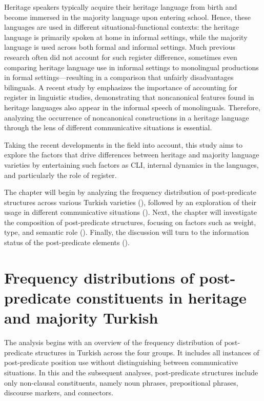 Heritage speakers typically acquire their heritage language from birth and become immersed in the majority language upon entering school. Hence, these languages are used in different situational-functional contexts: the heritage language is primarily spoken at home in informal settings, while the majority language is used across both formal and informal settings. Much previous research often did not account for such register difference, sometimes even comparing heritage language use in informal settings to monolingual productions in formal settings—resulting in a comparison that unfairly disadvantages bilinguals. A recent study by \citet{WieseEtAl2022} emphasizes the importance of accounting for register in linguistic studies, demonstrating that noncanonical features found in heritage languages also appear in the informal speech of monolinguals. Therefore, analyzing the occurrence of noncanonical constructions in a heritage language through the lens of different communicative situations is essential.

Taking the recent developments in the field into account, this study aims to explore the factors that drive differences between heritage and majority language varieties by entertaining such factors as CLI, internal dynamics in the languages, and particularly the role of register.

The chapter will begin by analyzing the frequency distribution of post-predicate structures across various Turkish varieties (), followed by an exploration of their usage in different communicative situations (). Next, the chapter will investigate the composition of post-predicate structures, focusing on factors such as weight, type, and semantic role (). Finally, the discussion will turn to the information status of the post-predicate elements ().

\section[Frequency distributions  in heritage and majority Turkish]{Frequency distributions of post-predicate constituents in heritage and majority Turkish}\label{sec:key:5.1}

The analysis begins with an overview of the frequency distribution of post-predicate structures in Turkish across the four groups. It includes all instances of post-predicate position use without distinguishing between communicative situations. In this and the subsequent analyses, post-predicate structures include only non-clausal constituents, namely noun phrases, prepositional phrases, discourse markers, and connectors.

